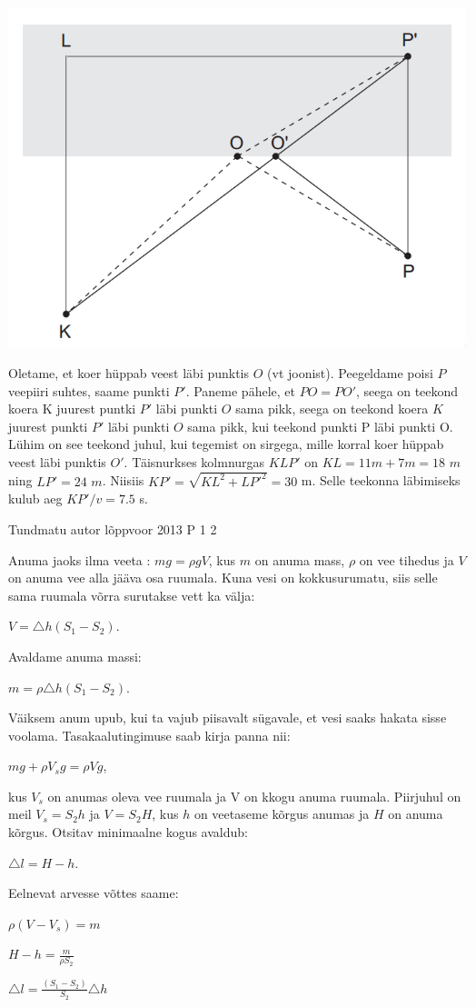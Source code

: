\documentclass[11pt]{article}
\begin{document}
{{\ifSolution
\begin{center}
	\includegraphics[width=0.5\linewidth]{2012-v3p-04-lah.PNG}
\end{center}
Oletame, et koer hüppab veest läbi punktis $O$ (vt joonist). Peegeldame poisi $P$ veepiiri suhtes, saame punkti $P'$. Paneme pähele, et $PO = PO'$, seega on teekond koera K juurest puntki $P'$ läbi punkti $O$ sama pikk, seega on teekond koera $K$ juurest punkti $P'$ läbi punkti $O$ sama pikk, kui teekond punkti P läbi punkti O. Lühim on see teekond juhul, kui tegemist on sirgega, mille korral koer hüppab veest läbi punktis $O'$.
\newline
Täisnurkses kolmnurgas $KLP'$ on $KL = 11 m + 7 m = 18$ $m$ ning $LP' = 24$ $m$. Niisiis $KP' = \sqrt{KL^2 + LP'^2} = 30$ m. Selle teekonna läbimiseks kulub aeg $KP' /v = 7.5$ s.
\fi
}

{Tundmatu autor} %
{lõppvoor} %
{2013} %
{P 1} %
{2} %
{

\ifSolution
Anuma jaoks ilma veeta : $mg = \rho g V$, kus $m$ on anuma mass, $\rho$ on vee tihedus ja $V$ on anuma vee alla jääva osa ruumala. Kuna vesi on kokkusurumatu, siis selle sama ruumala võrra surutakse vett ka välja:
\begin{center}
$V = \triangle h (S_1 - S_2).$
\end{center}
Avaldame anuma massi:
\begin{center}
$m = \rho \triangle h (S_1 - S_2)$.
\end{center}
Väiksem anum upub, kui ta vajub piisavalt sügavale, et vesi saaks hakata sisse voolama. Tasakaalutingimuse saab kirja panna nii: 
\begin{center}
$mg + \rho V_s g = \rho V g$,
\end{center}
kus $V_s$ on anumas oleva vee ruumala ja V on kkogu anuma ruumala. Piirjuhul on meil $V_s = S_2 h $ ja $V = S_2 H$, kus $h$ on veetaseme kõrgus anumas ja $H$ on anuma kõrgus. Otsitav minimaalne kogus avaldub:
\begin{center}
$\triangle l = H - h$.
\end{center}
Eelnevat arvesse võttes saame: 
\begin{center}
$\rho (V - V_s) = m$
\end{center}
\begin{center}
$H - h = \frac{m}{\rho S_2}$
\end{center}
\begin{center}
$\triangle l = \frac{(S_1 - S_2)}{S_2} \triangle h$
\end{center}
\fi
}

}
\end{document}
